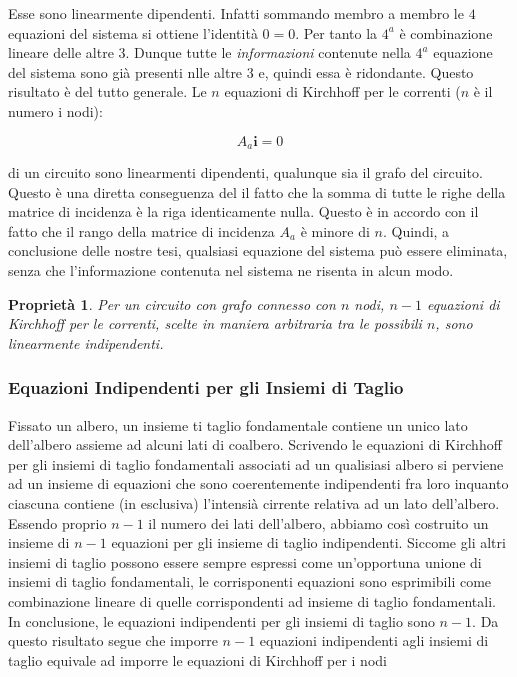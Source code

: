 \documentclass[a4paper]{report}
\newtheorem{prop}{Propriet\`a}
\begin{document}
Esse sono linearmente dipendenti. Infatti sommando membro a membro le
$4$ equazioni del sistema si ottiene l'identit\`a $0=0$. Per tanto la
$4^a$ \`e combinazione lineare delle altre $3$. Dunque tutte le
\emph{informazioni} contenute nella $4^a$ equazione del sistema sono
gi\`a presenti nlle altre $3$ e, quindi essa \`e ridondante.
Questo risultato \`e del tutto generale. Le $n$ equazioni di Kirchhoff
per le correnti ($n$ \`e il numero i nodi):

\[
A_a{\mathbf i}=0
\]

di un circuito sono linearmenti dipendenti, qualunque sia il grafo del
circuito. Questo \`e una diretta conseguenza del il fatto che la somma di tutte le
righe della matrice di incidenza \`e la riga identicamente
nulla. Questo \`e in accordo con il fatto che il rango della matrice
di incidenza $A_a$ \`e minore di $n$. Quindi, a conclusione delle
nostre tesi, qualsiasi equazione del sistema pu\`o essere eliminata,
senza che l'informazione contenuta nel sistema ne risenta in alcun
modo.

\begin{prop}
  Per un circuito con grafo connesso con $n$ nodi, $n-1$ equazioni di
  Kirchhoff per le correnti, scelte in maniera arbitraria tra le
  possibili $n$, sono linearmente indipendenti.
\end{prop}

\subsubsection{Equazioni Indipendenti per gli Insiemi di Taglio}
Fissato un albero, un insieme ti taglio fondamentale contiene un unico
lato dell'albero assieme ad alcuni lati di coalbero. Scrivendo le
equazioni di Kirchhoff per gli insiemi di taglio fondamentali
associati ad un qualisiasi albero si perviene ad un insieme di
equazioni che sono coerentemente indipendenti fra loro inquanto
ciascuna contiene (in esclusiva) l'intensi\`a cirrente relativa ad un
lato dell'albero. Essendo proprio $n-1$ il numero dei lati
dell'albero, abbiamo cos\`i costruito un insieme di $n-1$ equazioni
per gli insieme di taglio indipendenti. Siccome gli altri insiemi di
taglio possono essere sempre espressi come un'opportuna unione di
insiemi di taglio fondamentali, le corrisponenti equazioni sono
esprimibili come combinazione lineare di quelle corrispondenti ad
insieme di taglio fondamentali. In conclusione, le equazioni
indipendenti per gli insiemi di taglio sono $n-1$. Da questo risultato
segue che imporre $n-1$ equazioni indipendenti agli insiemi di taglio
equivale ad imporre le equazioni di Kirchhoff per i nodi
\end{document}
